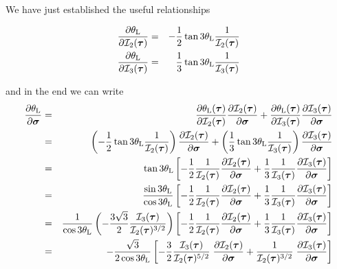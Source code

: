 We have just established the useful relationships
\begin{mdframed}[backgroundcolor=blue!5]
\begin{eqnarray}
\frac{\partial \theta_{\rm L}}{\partial {\cal I}_2(\bm\tau)}
&=& -\frac12 \tan 3\theta_{\rm L} \frac{1}{ {\cal I}_2(\bm\tau)}  \label{eq:dthetadI2} \\
\frac{\partial \theta_{\rm L}}{\partial {\cal I}_3(\bm\tau)}
&=& \frac13 \tan 3\theta_{\rm L} \frac{1}{{\cal I}_3(\bm\tau)}   \label{eq:dthetadI3}
\end{eqnarray}
\end{mdframed}
and in the end we can write
\begin{eqnarray}
\frac{\partial \theta_{\rm L}}{\partial \bm\sigma}
&=&
\frac{\partial \theta_{\rm L}(\bm\tau)}{\partial {\cal I}_2(\bm\tau)}
\frac{\partial {\cal I}_2(\bm\tau)}{\partial \bm\sigma}
+
\frac{\partial \theta_{\rm L}(\bm\tau)}{\partial {\cal I}_3(\bm\tau)}
\frac{\partial {\cal I}_3(\bm\tau)}{\partial \bm\sigma} \nonumber\\
&=&
\left(-\frac12 \tan 3\theta_{\rm L} \frac{1}{ {\cal I}_2(\bm\tau)}  \right)
\frac{\partial {\cal I}_2(\bm\tau)}{\partial \bm\sigma} 
+ 
\left(\frac13 \tan 3\theta_{\rm L} \frac{1}{{\cal I}_3(\bm\tau)} \right)
 \frac{\partial  {\cal I}_3(\bm\tau)}{\partial \bm\sigma} \nonumber\\
&=&
\tan 3\theta_{\rm L}
\left[
-\frac12  \frac{1}{ {\cal I}_2(\bm\tau)}
 \frac{\partial {\cal I}_2(\bm\tau)}{\partial \bm\sigma} 
+ \frac13 \frac{1}{{\cal I}_3(\bm\tau)} 
 \frac{\partial {\cal I}_3(\bm\tau)}{\partial \bm\sigma} 
\right]
\nonumber\\
&=&
\frac{\sin 3\theta_{\rm L}}{\cos 3\theta_{\rm L}}
\left[
-\frac12  \frac{1}{ {\cal I}_2(\bm\tau)}
 \frac{\partial {\cal I}_2(\bm\tau)}{\partial \bm\sigma} 
+ \frac13 \frac{1}{{\cal I}_3(\bm\tau)} 
 \frac{\partial {\cal I}_3(\bm\tau)}{\partial \bm\sigma} 
\right]
\nonumber\\
&=&
\frac{1}{\cos 3\theta_{\rm L}}
\left(-\frac{3\sqrt{3}}{2}  \frac{{\cal I}_3(\bm\tau)}{{\cal I}_2(\bm\tau)^{3/2}} \right)
\left[
-\frac12  \frac{1}{ {\cal I}_2(\bm\tau)}
 \frac{\partial {\cal I}_2(\bm\tau)}{\partial \bm\sigma} 
+ \frac13 \frac{1}{{\cal I}_3(\bm\tau)} 
 \frac{\partial {\cal I}_3(\bm\tau)}{\partial \bm\sigma} 
\right]
\nonumber\\
&=&
-\frac{\sqrt{3}}{2\cos 3\theta_{\rm L}}
\left[
-\frac32  \frac{ {\cal I}_3(\bm\tau)   }{ {\cal I}_2(\bm\tau)^{5/2}}
\; \frac{\partial {\cal I}_2(\bm\tau)}{\partial \bm\sigma} 
+  \frac{1}{{\cal I}_2(\bm\tau)^{3/2}} 
\; \frac{\partial {\cal I}_3(\bm\tau)}{\partial \bm\sigma} 
\right]
\end{eqnarray}
